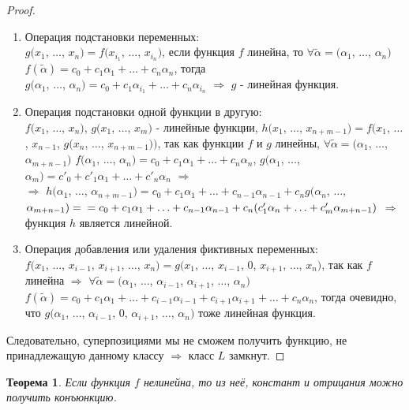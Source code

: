 \documentclass[a4paper, 12pt]{article}
\theoremstyle{definition}
\theoremstyle{plain}
\newtheorem*{theorem}{Теорема}
\theoremstyle{remark}
\begin{document}
  \begin{proof}
    \begin{enumerate}
      \item Операция подстановки переменных:\\
      $g(x_1$, $\ldots$, $x_n)=f(x_{i_1}$, $\ldots$, $x_{i_n})$, если функция $f$ линейна, то $\forall\tilde{\alpha}=(\alpha_1$, $\ldots$, $\alpha_n)$ $f(\tilde{\alpha})=c_0+c_1\alpha_1+\ldots+c_n\alpha_n$, тогда\\
      $g(\alpha_1$, $\ldots$, $\alpha_n)=c_0+c_1\alpha_{i_1}+\ldots+c_n\alpha_{i_n}$ $\Longrightarrow$ $g$ - линейная функция.
      \item Операция подстановки одной функции в другую:\\ 
      $f(x_{1}$, $\ldots$, $x_{n})$, $g(x_{1}$, $\ldots$, $x_{m})$ - линейные функции, $h(x_1$, $\ldots$, $x_{n+m-1})=f(x_1$, $\ldots$, $x_{n-1}$, $g(x_n$, $\ldots$, $x_{n+m-1}))$, так как функции $f$ и $g$ линейны, $\forall\tilde{\alpha}=(\alpha_1$, $\ldots$, $\alpha_{m+n-1})$ $f(\alpha_1$, $\ldots$, $\alpha_n)=c_0+c_1\alpha_1+\ldots+c_n\alpha_n$, $g(\alpha_1$, $\ldots$, $\alpha_m)=c'_0+c'_1\alpha_1+\ldots+c'_n\alpha_n$ $\Longrightarrow$\\
      $\Longrightarrow$ $h(\alpha_1$, $\ldots$, $\alpha_{n+m-1})=c_0+c_1\alpha_1+\ldots+c_{n-1}\alpha_{n-1}+c_ng(\alpha_n$, $\ldots$, $\alpha_{m+n-1})=\\=c_0+c_1\alpha_1+\ldots+c_{n-1}\alpha_{n-1}+c_n(c'_1\alpha_n+\ldots+c'_m\alpha_{m+n-1})$ $\Longrightarrow$ функция $h$ является линейной.
      \item Операция добавления или удаления фиктивных переменных:\\$f(x_1$, $\ldots$, $x_{i-1}$, $x_{i+1}$, $\ldots$, $x_n)=g(x_1$, $\ldots$, $x_{i-1}$, $0$, $x_{i+1}$, $\ldots$, $x_n)$, так как $f$ линейна $\Longrightarrow$ $\forall\tilde{\alpha}=(\alpha_1$, $\ldots$, $\alpha_{i-1}$, $\alpha_{i+1}$, $\ldots$, $\alpha_n)$ $f(\tilde{\alpha})=c_0+c_1\alpha_1+\ldots+c_{i-1}\alpha_{i-1}+c_{i+1}\alpha_{i+1}+\ldots+c_n\alpha_n$, тогда очевидно, что $g(\alpha_1$, $\ldots$, $\alpha_{i-1}$, $0$, $\alpha_{i+1}$, $\ldots$, $\alpha_n)$ тоже линейная функция. 
    \end{enumerate}
    Следовательно, суперпозициями мы не сможем получить функцию, не принадлежащую данному классу $\Longrightarrow$ класс $L$ замкнут. 
  \end{proof}
  \begin{theorem}
    Если функция $f$ нелинейна, то из неё, констант и отрицания можно получить конъюнкцию.
  \end{theorem}
\end{document}
